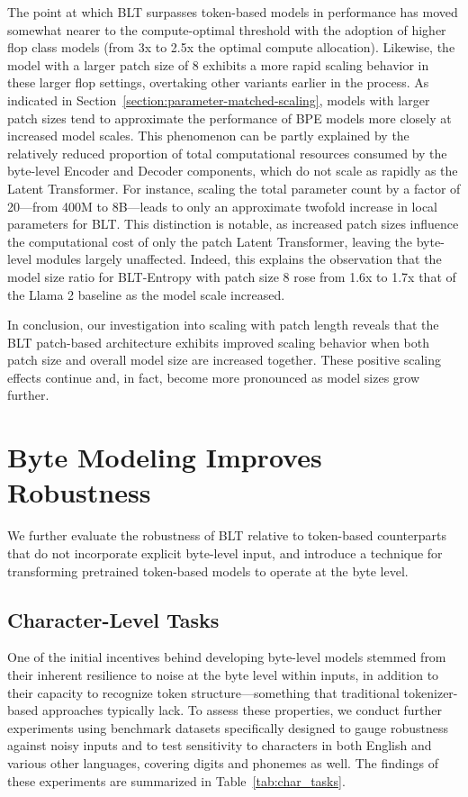 The point at which {\textsc BLT} surpasses token-based models in performance has moved somewhat nearer to the compute-optimal threshold with the adoption of higher flop class models (from 3x to 2.5x the optimal compute allocation). Likewise, the model with a larger patch size of 8 exhibits a more rapid scaling behavior in these larger flop settings, overtaking other variants earlier in the process. As indicated in Section~\ref{section:parameter-matched-scaling}, models with larger patch sizes tend to approximate the performance of BPE models more closely at increased model scales. This phenomenon can be partly explained by the relatively reduced proportion of total computational resources consumed by the byte-level Encoder and Decoder components, which do not scale as rapidly as the Latent Transformer. For instance, scaling the total parameter count by a factor of 20—from 400M to 8B—leads to only an approximate twofold increase in local parameters for {\textsc BLT}. This distinction is notable, as increased patch sizes influence the computational cost of only the patch Latent Transformer, leaving the byte-level modules largely unaffected. Indeed, this explains the observation that the model size ratio for {\textsc BLT}-Entropy with patch size 8 rose from 1.6x to 1.7x that of the Llama 2 baseline as the model scale increased.

In conclusion, our investigation into scaling with patch length reveals that the {\textsc BLT} patch-based architecture exhibits improved scaling behavior when both patch size and overall model size are increased together. These positive scaling effects continue and, in fact, become more pronounced as model sizes grow further.

\section{Byte Modeling Improves Robustness} We further evaluate the robustness of {\textsc BLT} relative to token-based counterparts that do not incorporate explicit byte-level input, and introduce a technique for transforming pretrained token-based models to operate at the byte level.
\label{sec:robustness}

\subsection{Character-Level Tasks}

One of the initial incentives behind developing byte-level models stemmed from their inherent resilience to noise at the byte level within inputs, in addition to their capacity to recognize token structure—something that traditional tokenizer-based approaches typically lack. To assess these properties, we conduct further experiments using benchmark datasets specifically designed to gauge robustness against noisy inputs and to test sensitivity to characters in both English and various other languages, covering digits and phonemes as well. The findings of these experiments are summarized in Table~\ref{tab:char_tasks}.

